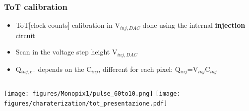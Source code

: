     \begin{frame}
        \frametitle{ToT calibration}
        \begin{itemize}
            \item ToT[clock counts] calibration in V$_{inj, DAC}$ done using the internal \textbf{injection} circuit
            \item Scan in the voltage step height V$_{inj, DAC}$
            \item Q$_{inj,e^-}$ depends on the C$_{inj}$, different for each pixel: Q$_{inj}$=V$_{inj}$C$_{inj}$\\  
        \end{itemize}
        \medskip
        \begin{columns}
                \texttt{[image: figures/Monopix1/pulse\_60to10.png]}
                \texttt{[image: figures/charaterization/tot\_presentazione.pdf]} 
        \end{columns}
    \end{frame}    

